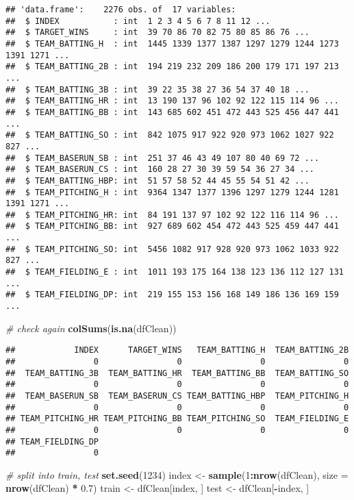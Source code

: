 \documentclass[
]{article}
\newenvironment{Shaded}{\begin{snugshade}}{\end{snugshade}}
\newcommand{\CommentTok}[1]{\textcolor[rgb]{0.56,0.35,0.01}{\textit{#1}}}
\newcommand{\DataTypeTok}[1]{\textcolor[rgb]{0.13,0.29,0.53}{#1}}
\newcommand{\DecValTok}[1]{\textcolor[rgb]{0.00,0.00,0.81}{#1}}
\newcommand{\FloatTok}[1]{\textcolor[rgb]{0.00,0.00,0.81}{#1}}
\newcommand{\KeywordTok}[1]{\textcolor[rgb]{0.13,0.29,0.53}{\textbf{#1}}}
\newcommand{\NormalTok}[1]{#1}
\newcommand{\OperatorTok}[1]{\textcolor[rgb]{0.81,0.36,0.00}{\textbf{#1}}}
\newcommand{\StringTok}[1]{\textcolor[rgb]{0.31,0.60,0.02}{#1}}
\begin{document}
\begin{verbatim}
## 'data.frame':    2276 obs. of  17 variables:
##  $ INDEX           : int  1 2 3 4 5 6 7 8 11 12 ...
##  $ TARGET_WINS     : int  39 70 86 70 82 75 80 85 86 76 ...
##  $ TEAM_BATTING_H  : int  1445 1339 1377 1387 1297 1279 1244 1273 1391 1271 ...
##  $ TEAM_BATTING_2B : int  194 219 232 209 186 200 179 171 197 213 ...
##  $ TEAM_BATTING_3B : int  39 22 35 38 27 36 54 37 40 18 ...
##  $ TEAM_BATTING_HR : int  13 190 137 96 102 92 122 115 114 96 ...
##  $ TEAM_BATTING_BB : int  143 685 602 451 472 443 525 456 447 441 ...
##  $ TEAM_BATTING_SO : int  842 1075 917 922 920 973 1062 1027 922 827 ...
##  $ TEAM_BASERUN_SB : int  251 37 46 43 49 107 80 40 69 72 ...
##  $ TEAM_BASERUN_CS : int  160 28 27 30 39 59 54 36 27 34 ...
##  $ TEAM_BATTING_HBP: int  51 57 58 52 44 45 55 54 51 42 ...
##  $ TEAM_PITCHING_H : int  9364 1347 1377 1396 1297 1279 1244 1281 1391 1271 ...
##  $ TEAM_PITCHING_HR: int  84 191 137 97 102 92 122 116 114 96 ...
##  $ TEAM_PITCHING_BB: int  927 689 602 454 472 443 525 459 447 441 ...
##  $ TEAM_PITCHING_SO: int  5456 1082 917 928 920 973 1062 1033 922 827 ...
##  $ TEAM_FIELDING_E : int  1011 193 175 164 138 123 136 112 127 131 ...
##  $ TEAM_FIELDING_DP: int  219 155 153 156 168 149 186 136 169 159 ...
\end{verbatim}

\begin{Shaded}
\begin{Highlighting}[]
\CommentTok{# check again}
\KeywordTok{colSums}\NormalTok{(}\KeywordTok{is.na}\NormalTok{(dfClean))        }
\end{Highlighting}
\end{Shaded}

\begin{verbatim}
##            INDEX      TARGET_WINS   TEAM_BATTING_H  TEAM_BATTING_2B 
##                0                0                0                0 
##  TEAM_BATTING_3B  TEAM_BATTING_HR  TEAM_BATTING_BB  TEAM_BATTING_SO 
##                0                0                0                0 
##  TEAM_BASERUN_SB  TEAM_BASERUN_CS TEAM_BATTING_HBP  TEAM_PITCHING_H 
##                0                0                0                0 
## TEAM_PITCHING_HR TEAM_PITCHING_BB TEAM_PITCHING_SO  TEAM_FIELDING_E 
##                0                0                0                0 
## TEAM_FIELDING_DP 
##                0
\end{verbatim}

\begin{Shaded}
\begin{Highlighting}[]
\CommentTok{# split into train, test}
\KeywordTok{set.seed}\NormalTok{(}\DecValTok{1234}\NormalTok{)}
\NormalTok{index <-}\StringTok{ }\KeywordTok{sample}\NormalTok{(}\DecValTok{1}\OperatorTok{:}\KeywordTok{nrow}\NormalTok{(dfClean), }\DataTypeTok{size =} \KeywordTok{nrow}\NormalTok{(dfClean) }\OperatorTok{*}\StringTok{ }\FloatTok{0.7}\NormalTok{)}
\NormalTok{train <-}\StringTok{ }\NormalTok{dfClean[index, ]}
\NormalTok{test <-}\StringTok{ }\NormalTok{dfClean[}\OperatorTok{-}\NormalTok{index, ]}
\end{Highlighting}
\end{Shaded}
\end{document}
